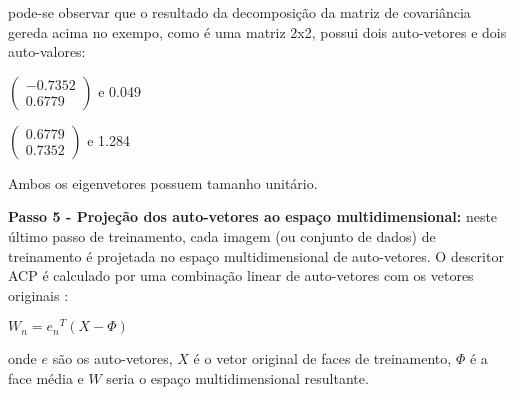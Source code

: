pode-se observar que o resultado da decomposição da matriz de covariância gereda acima no exempo, como é uma matriz 2x2, possui dois auto-vetores e dois auto-valores:
\begin{center}
	$\begin{pmatrix} -0.7352 \\ 0.6779 \end{pmatrix}$  e 0.049
	
	$\begin{pmatrix} 0.6779 \\ 0.7352 \end{pmatrix}$  e 1.284
\end{center}
Ambos os eigenvetores possuem tamanho unitário.


\textbf{Passo 5 - Projeção dos auto-vetores ao espaço multidimensional:}  neste último passo de treinamento, cada imagem (ou conjunto de dados) de treinamento é projetada no espaço multidimensional de auto-vetores. O descritor ACP é calculado por uma combinação linear de auto-vetores com os vetores originais \cite{geysilva}:
\begin{center}
	$W_n = {e_n}^T (X - \Phi)$	
\end{center}
onde $e$ são os auto-vetores, $X$ é o vetor original de faces de treinamento, $\Phi$ é a face média e $W$ seria o espaço multidimensional resultante.







